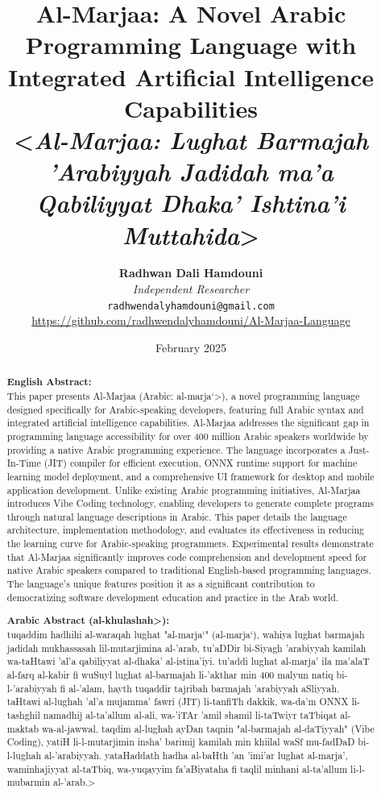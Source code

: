 \documentclass[11pt,a4paper]{article}
\title{\textbf{Al-Marjaa: A Novel Arabic Programming Language with Integrated Artificial Intelligence Capabilities}\\
\Large\vspace{0.5cm}<\textit{Al-Marjaa: Lughat Barmajah 'Arabiyyah Jadidah ma'a Qabiliyyat Dhaka' Ishtina'i Muttahida}>}
\author{
\textbf{Radhwan Dali Hamdouni}\\
\textit{Independent Researcher}\\
\texttt{radhwendalyhamdouni@gmail.com}\\
\url{https://github.com/radhwendalyhamdouni/Al-Marjaa-Language}
}
\date{February 2025}
\begin{document}
\maketitle

\begin{abstract}
\textbf{English Abstract:}\\
This paper presents Al-Marjaa (Arabic: \<al-marja`>), a novel programming language designed specifically for Arabic-speaking developers, featuring full Arabic syntax and integrated artificial intelligence capabilities. Al-Marjaa addresses the significant gap in programming language accessibility for over 400 million Arabic speakers worldwide by providing a native Arabic programming experience. The language incorporates a Just-In-Time (JIT) compiler for efficient execution, ONNX runtime support for machine learning model deployment, and a comprehensive UI framework for desktop and mobile application development. Unlike existing Arabic programming initiatives, Al-Marjaa introduces Vibe Coding technology, enabling developers to generate complete programs through natural language descriptions in Arabic. This paper details the language architecture, implementation methodology, and evaluates its effectiveness in reducing the learning curve for Arabic-speaking programmers. Experimental results demonstrate that Al-Marjaa significantly improves code comprehension and development speed for native Arabic speakers compared to traditional English-based programming languages. The language's unique features position it as a significant contribution to democratizing software development education and practice in the Arab world.

\vspace{0.5cm}
\textbf{Arabic Abstract (\<al-khulashah>):}\\
\<tuqaddim hadhihi al-waraqah lughat "al-marja`" (al-marja`), wahiya lughat barmajah jadidah mukhassasah lil-mutarjimina al-'arab, tu'aDDir bi-Siyagh 'arabiyyah kamilah wa-taHtawi 'al'a qabiliyyat al-dhaka' al-istina'iyi. tu'addi lughat al-marja' ila ma'alaT al-farq al-kabir fi wuSuyl lughat al-barmajah li-'akthar min 400 malyun natiq bi-l-'arabiyyah fi al-'alam, hayth tuqaddir tajribah barmajah 'arabiyyah aSliyyah. taHtawi al-lughah 'al'a mujamma' fawri (JIT) li-tanfiTh dakkik, wa-da'm ONNX li-tashghil namadhij al-ta'allum al-ali, wa-'iTAr 'amil shamil li-taTwiyr taTbiqat al-maktab wa-al-jawwal. taqdim al-lughah ayDan taqnin "al-barmajah al-daTiyyah" (Vibe Coding), yatiH li-l-mutarjimin insha' barimij kamilah min khiilal waSf mu-fadDaD bi-l-lughah al-'arabiyyah. yataHaddath hadha al-baHth 'an 'imi'ar lughat al-marja', waminhajiyyat al-taTbiq, wa-yuqayyim fa'aBiyataha fi taqlil minhani al-ta'allum li-l-mubarmin al-'arab.>


\end{abstract}
\end{document}
